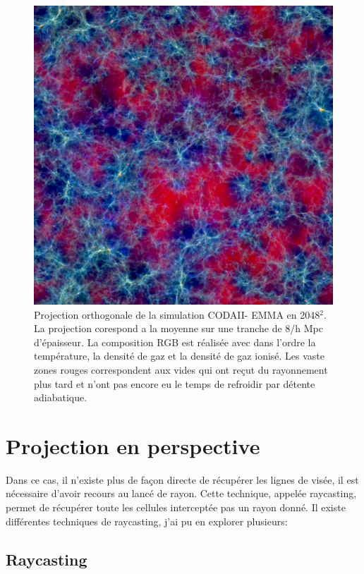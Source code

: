 \begin{figure}[bth]
        \includegraphics[width=.95\linewidth]{img/04/rgb-compose.jpeg} 
        \caption{Projection orthogonale de la simulation CODAII- EMMA en 2048$^2$.
        La projection corespond a la moyenne sur une tranche de 8/h Mpc d'épaisseur. 
        La composition RGB est réalisée avec dans l'ordre la température, la densité de gaz et la densité de gaz ionisé.
		Les vaste zones rouges correspondent aux vides qui ont reçut du rayonnement plus tard et n'ont pas encore eu le temps de refroidir par détente adiabatique.  
        }
 		\label{fig:ortho}
\end{figure}

\section{Projection en perspective}

Dans ce cas, il n'existe plus de façon directe de récupérer les lignes de visée, il est nécessaire d'avoir recours au lancé de rayon.
Cette technique, appelée raycasting, permet de récupérer toute les cellules interceptée pas un rayon donné.
Il existe différentes techniques de raycasting, j'ai pu en explorer plusieurs:

\subsection{Raycasting}
